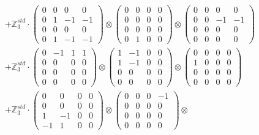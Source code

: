 \documentclass{article}
\begin{document}
{\begin{align}
        &+ \label{Rs16-Rc11-Solution-12-c22} \mathbb{Z}_3^{std} \cdot 
            \begin{pmatrix} 0 & 0 & 0 & 0 \\ 0 & 1 & -1 & -1 \\ 0 & 0 & 0 & 0 \\ 0 & 1 & -1 & -1 \end{pmatrix} \otimes 
            \begin{pmatrix} 0 & 0 & 0 & 0 \\ 0 & 0 & 0 & 0 \\ 0 & 0 & 0 & 0 \\ 0 & 1 & 0 & 0 \end{pmatrix} \otimes 
            \begin{pmatrix} 0 & 0 & 0 & 0 \\ 0 & 0 & -1 & -1 \\ 0 & 0 & 0 & 0 \\ 0 & 0 & 0 & 0 \end{pmatrix} \\ 
        &+ \label{Rs16-Rc11-Solution-12-c23} \mathbb{Z}_3^{std} \cdot 
            \begin{pmatrix} 0 & -1 & 1 & 1 \\ 0 & 0 & 0 & 0 \\ 0 & 0 & 0 & 0 \\ 0 & 0 & 0 & 0 \end{pmatrix} \otimes 
            \begin{pmatrix} 1 & -1 & 0 & 0 \\ 1 & -1 & 0 & 0 \\ 0 & 0 & 0 & 0 \\ 0 & 0 & 0 & 0 \end{pmatrix} \otimes 
            \begin{pmatrix} 0 & 0 & 0 & 0 \\ 1 & 0 & 0 & 0 \\ 0 & 0 & 0 & 0 \\ 0 & 0 & 0 & 0 \end{pmatrix} \\ 
        &+ \label{Rs16-Rc11-Solution-12-c24} \mathbb{Z}_3^{std} \cdot 
            \begin{pmatrix} 0 & 0 & 0 & 0 \\ 0 & 0 & 0 & 0 \\ 1 & -1 & 0 & 0 \\ -1 & 1 & 0 & 0 \end{pmatrix} \otimes 
            \begin{pmatrix} 0 & 0 & 0 & -1 \\ 0 & 0 & 0 & 0 \\ 0 & 0 & 0 & 0 \\ 0 & 0 & 0 & 0 \end{pmatrix} \otimes 

\end{align}}
\end{document}
